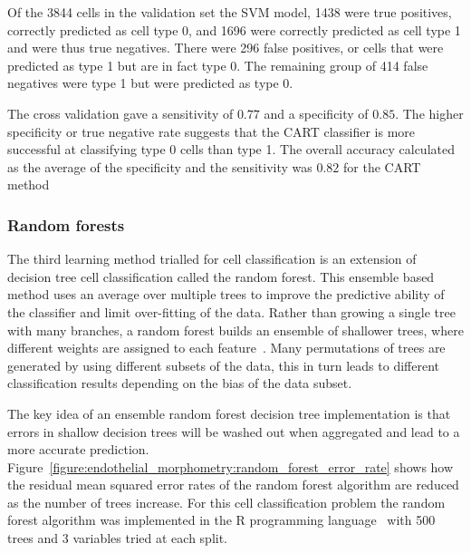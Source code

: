 Of the 3844 cells in the validation set the SVM model, 1438 were true positives, correctly predicted as cell type 0, and 1696 were correctly predicted as cell type 1 and were thus true negatives. There were 296 false positives, or cells that were predicted as type 1 but are in fact type 0. The remaining group of 414 false negatives were type 1 but were predicted as type 0.

The cross validation gave a sensitivity of $0.77$ and a specificity of $0.85$. The higher specificity or true negative rate suggests that the CART classifier is more successful at classifying type 0 cells than type 1. The overall accuracy calculated as the average of the specificity and the sensitivity was $0.82$ for the CART method

\subsubsection{Random forests}
The third learning method trialled for cell classification is an extension of decision tree cell classification called the random forest. This ensemble based method uses an average over multiple trees to improve the predictive ability of the classifier and limit over-fitting of the data. Rather than growing a single tree with many branches, a random forest builds an ensemble of shallower trees, where different weights are assigned to each feature~\cite{Breiman2001}. Many permutations of trees are generated by using different subsets of the data, this in turn leads to different classification results depending on the bias of the data subset.

The key idea of an ensemble random forest decision tree implementation is that errors in shallow decision trees will be washed out when aggregated and lead to a more accurate prediction. Figure~\ref{figure:endothelial_morphometry:random_forest_error_rate} shows how the residual mean squared error rates of the random forest algorithm are reduced as the number of trees increase. For this cell classification problem the random forest algorithm was implemented in the R programming language~\cite{RCoreTeam2014} with 500 trees and 3 variables tried at each split.

